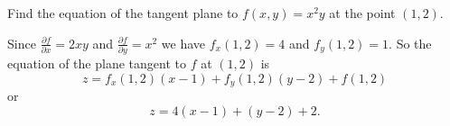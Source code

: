 \begin{activity} \label{A:10.4.1} Find the equation of the tangent plane to $f(x,y) = x^2y$ at the point $(1,2)$.


\end{activity}
\begin{smallhint}

\end{smallhint}
\begin{bighint}

\end{bighint}
\begin{activitySolution}
Since $\frac{\partial f}{\partial x} = 2xy$ and $\frac{\partial f}{\partial y} = x^2$ we have $f_x(1,2) = 4$ and $f_y(1,2) =1$. So the equation of the plane tangent to $f$ at $(1,2)$ is
\[z = f_x(1,2)(x-1) + f_y(1,2)(y-2) + f(1,2)\]
or
\[z = 4(x-1) + (y-2) + 2.\]
\end{activitySolution}
\aftera

